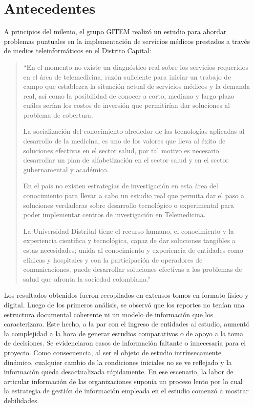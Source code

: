 \chapter{Antecedentes}

A principios del milenio, el grupo GITEM realizó un estudio para abordar problemas puntuales en la implementación de servicios médicos prestados a través de medios teleinformáticos en el Distrito Capital\cite{aparicio2000}:

\begin{quote}
“En el momento no existe un diagnóstico real sobre los servicios requeridos en el área de telemedicina, razón suficiente para iniciar un trabajo de campo que establezca la situación actual de servicios médicos y la demanda real, así como la posibilidad de conocer a corto, mediano y largo plazo cuáles serían los costos de inversión que permitirían dar soluciones al problema  de cobertura.

La socialización del conocimiento alrededor de las tecnologías aplicadas al desarrollo de la medicina, es uno de los valores que lleva al éxito de soluciones efectivas en el sector salud, por tal motivo es necesario desarrollar un plan de alfabetización en el sector salud y en el sector gubernamental y académico.

En el país no existen estrategias de investigación en esta área del conocimiento para llevar a cabo un estudio real que permita dar el paso a soluciones verdaderas sobre desarrollo tecnológico o experimental para poder implementar centros de investigación en Telemedicina.

La Universidad Distrital tiene el recurso humano, el conocimiento y la experiencia científica y tecnológica, capaz de dar soluciones tangibles a estas necesidades; unida al conocimiento y experiencia de entidades como clínicas y hospitales  y con la participación de operadores de comunicaciones, puede desarrollar soluciones efectivas a los problemas de salud que afronta la sociedad colombiana.”
\end{quote}

Los resultados obtenidos fueron recopilados en extensos tomos en formato físico y digital. Luego de los primeros análisis, se observó que los reportes no tenían una estructura documental coherente ni un modelo de información que los caracterizara. Este hecho, a la par con el ingreso de entidades al estudio, aumentó la complejidad a la hora de generar estudios comparativos o de apoyo a la toma de decisiones. Se evidenciaron casos de información faltante o innecesaria para el proyecto. Como consecuencia, al ser el objeto de estudio intrínsecamente dinámico, cualquier cambio de la condiciones iniciales no se ve reflejado y la información queda desactualizada rápidamente. En ese escenario, la labor de articular información de las organizaciones suponía un proceso lento por lo cual la estrategia de gestión de información empleada en el estudio comenzó a mostrar debilidades.

